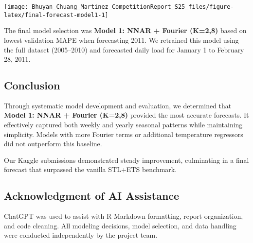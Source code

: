\documentclass[
]{article}
\begin{document}
\begin{center}\texttt{[image: Bhuyan\_Chuang\_Martinez\_CompetitionReport\_S25\_files/figure-latex/final-forecast-model1-1]} \end{center}

The final model selection was \textbf{Model 1: NNAR + Fourier (K=2,8)}
based on lowest validation MAPE when forecasting 2011. We retrained this
model using the full dataset (2005--2010) and forecasted daily load for
January 1 to February 28, 2011.

\subsection{Conclusion}\label{conclusion}

Through systematic model development and evaluation, we determined that
\textbf{Model 1: NNAR + Fourier (K=2,8)} provided the most accurate
forecasts. It effectively captured both weekly and yearly seasonal
patterns while maintaining simplicity. Models with more Fourier terms or
additional temperature regressors did not outperform this baseline.

Our Kaggle submissions demonstrated steady improvement, culminating in a
final forecast that surpassed the vanilla STL+ETS benchmark.

\subsection{Acknowledgment of AI
Assistance}\label{acknowledgment-of-ai-assistance}

ChatGPT was used to assist with R Markdown formatting, report
organization, and code cleaning. All modeling decisions, model
selection, and data handling were conducted independently by the project
team.
\end{document}
